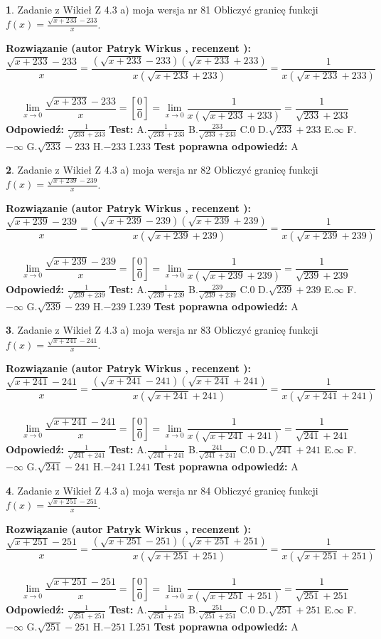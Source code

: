 \documentclass[12pt, a4paper]{article}
\theoremstyle{definition} %
\newtheorem{zad}{}
\newcommand{\zadStart}[1]{\begin{zad}#1\newline}
\newcommand{\zadStop}{\end{zad}}
\newcommand{\rozwStart}[2]{\noindent \textbf{Rozwiązanie (autor #1 , recenzent #2): }\newline}
\newcommand{\rozwStop}{\newline}
\newcommand{\odpStart}{\noindent \textbf{Odpowiedź:}\newline}
\newcommand{\odpStop}{\newline}
\newcommand{\testStart}{\noindent \textbf{Test:}\newline}
\newcommand{\testStop}{\newline}
\newcommand{\kluczStart}{\noindent \textbf{Test poprawna odpowiedź:}\newline}
\newcommand{\kluczStop}{\newline}
\begin{document}
\zadStart{Zadanie z Wikieł Z 4.3 a) moja wersja nr 81}
Obliczyć granicę funkcji $f(x)=\frac{\sqrt{x+233}-233}{x}$.
\zadStop
\rozwStart{Patryk Wirkus}{}
$$\frac{\sqrt{x+233}-233}{x}=\frac{(\sqrt{x+233}-233)(\sqrt{x+233}+233)}{x(\sqrt{x+233}+233)}=\frac{1}{x(\sqrt{x+233}+233)}$$
\\
$$\lim\limits_{x\to0}\frac{\sqrt{x+233}-233}{x}=[\frac{0}{0}]=
\lim\limits_{x\to0}\frac{1}{x(\sqrt{x+233}+233)} = \frac{1}{\sqrt{233}+233}$$
\rozwStop
\odpStart
$\frac{1}{\sqrt{233}+233}$
\odpStop
\testStart
A.$\frac{1}{\sqrt{233}+233}$
B.$\frac{233}{\sqrt{233}+233}$
C.$0$
D.$\sqrt{233}+233$
E.$\infty$
F.$-\infty$
G.$\sqrt{233}-233$
H.$-233$
I.$233$
\testStop
\kluczStart
A
\kluczStop



\zadStart{Zadanie z Wikieł Z 4.3 a) moja wersja nr 82}
Obliczyć granicę funkcji $f(x)=\frac{\sqrt{x+239}-239}{x}$.
\zadStop
\rozwStart{Patryk Wirkus}{}
$$\frac{\sqrt{x+239}-239}{x}=\frac{(\sqrt{x+239}-239)(\sqrt{x+239}+239)}{x(\sqrt{x+239}+239)}=\frac{1}{x(\sqrt{x+239}+239)}$$
\\
$$\lim\limits_{x\to0}\frac{\sqrt{x+239}-239}{x}=[\frac{0}{0}]=
\lim\limits_{x\to0}\frac{1}{x(\sqrt{x+239}+239)} = \frac{1}{\sqrt{239}+239}$$
\rozwStop
\odpStart
$\frac{1}{\sqrt{239}+239}$
\odpStop
\testStart
A.$\frac{1}{\sqrt{239}+239}$
B.$\frac{239}{\sqrt{239}+239}$
C.$0$
D.$\sqrt{239}+239$
E.$\infty$
F.$-\infty$
G.$\sqrt{239}-239$
H.$-239$
I.$239$
\testStop
\kluczStart
A
\kluczStop



\zadStart{Zadanie z Wikieł Z 4.3 a) moja wersja nr 83}
Obliczyć granicę funkcji $f(x)=\frac{\sqrt{x+241}-241}{x}$.
\zadStop
\rozwStart{Patryk Wirkus}{}
$$\frac{\sqrt{x+241}-241}{x}=\frac{(\sqrt{x+241}-241)(\sqrt{x+241}+241)}{x(\sqrt{x+241}+241)}=\frac{1}{x(\sqrt{x+241}+241)}$$
\\
$$\lim\limits_{x\to0}\frac{\sqrt{x+241}-241}{x}=[\frac{0}{0}]=
\lim\limits_{x\to0}\frac{1}{x(\sqrt{x+241}+241)} = \frac{1}{\sqrt{241}+241}$$
\rozwStop
\odpStart
$\frac{1}{\sqrt{241}+241}$
\odpStop
\testStart
A.$\frac{1}{\sqrt{241}+241}$
B.$\frac{241}{\sqrt{241}+241}$
C.$0$
D.$\sqrt{241}+241$
E.$\infty$
F.$-\infty$
G.$\sqrt{241}-241$
H.$-241$
I.$241$
\testStop
\kluczStart
A
\kluczStop



\zadStart{Zadanie z Wikieł Z 4.3 a) moja wersja nr 84}
Obliczyć granicę funkcji $f(x)=\frac{\sqrt{x+251}-251}{x}$.
\zadStop
\rozwStart{Patryk Wirkus}{}
$$\frac{\sqrt{x+251}-251}{x}=\frac{(\sqrt{x+251}-251)(\sqrt{x+251}+251)}{x(\sqrt{x+251}+251)}=\frac{1}{x(\sqrt{x+251}+251)}$$
\\
$$\lim\limits_{x\to0}\frac{\sqrt{x+251}-251}{x}=[\frac{0}{0}]=
\lim\limits_{x\to0}\frac{1}{x(\sqrt{x+251}+251)} = \frac{1}{\sqrt{251}+251}$$
\rozwStop
\odpStart
$\frac{1}{\sqrt{251}+251}$
\odpStop
\testStart
A.$\frac{1}{\sqrt{251}+251}$
B.$\frac{251}{\sqrt{251}+251}$
C.$0$
D.$\sqrt{251}+251$
E.$\infty$
F.$-\infty$
G.$\sqrt{251}-251$
H.$-251$
I.$251$
\testStop
\kluczStart
A
\kluczStop
\end{document}
